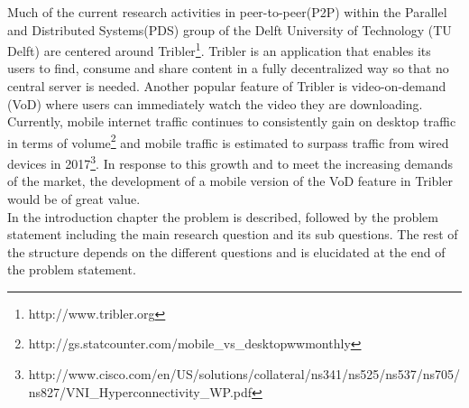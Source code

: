 Much of the current research activities in peer-to-peer(P2P) within the Parallel and Distributed Systems(PDS) group of the Delft University of Technology (TU Delft) are centered around Tribler\footnote{http://www.tribler.org}. Tribler is an application that enables its users to find, consume and share content in a fully decentralized way so that no central server is needed. Another popular feature of Tribler is video-on-demand (VoD) where users can immediately watch the video they are downloading. Currently, mobile internet traffic continues to consistently gain on desktop traffic in terms of volume\footnote{http://gs.statcounter.com/mobile\_vs\_desktop\-ww\-monthly} and mobile traffic is estimated to surpass traffic from wired devices in 2017\footnote{http://www.cisco.com/en/US/solutions/collateral/ns341/ns525/ns537/ns705/ns827/VNI\_Hyperconnectivity\_WP.pdf}. In response to this growth and to meet the increasing demands of the market, the development of a mobile version of the VoD feature in Tribler would be of great value.\\
In the introduction chapter the problem is described, followed by the problem statement including the main research question and its sub questions. The rest of the structure depends on the different questions and is elucidated at the end of the problem statement.
